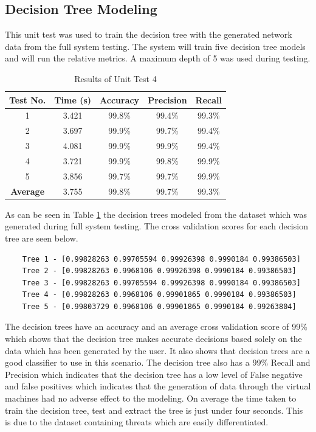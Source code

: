 \subsection{Decision Tree Modeling}
This unit test was used to train the decision tree with the generated network data from the full system testing. The system will train five decision tree models and will run the relative metrics. A maximum depth of 5 was used during testing.
\begin{table}[H]
\centering
\caption{Results of Unit Test 4}
\label{table:unittest4}
\begin{tabular}{ccccc}
    \textbf{Test No.}&\textbf{Time (s)}& \textbf{Accuracy}& \textbf{Precision}&	\textbf{Recall}\\
    \hline
    1& 3.421& 99.8\%& 99.4\%& 99.3\%\\
    2& 3.697& 99.9\%& 99.7\%& 99.4\%\\			
    3& 4.081& 99.9\%& 99.9\%& 99.4\%\\
    4& 3.721& 99.9\%& 99.8\%& 99.9\%\\
    5& 3.856& 99.7\%& 99.7\%& 99.9\%\\
    \hline
    \textbf{Average} & 3.755& 99.8\%& 99.7\%& 99.3\%\\
\end{tabular}
\end{table}
As can be seen in Table \ref{table:unittest4} the decision trees modeled from the dataset which was generated during full system testing. The cross validation scores for each decision tree are seen below.
\begin{verbatim}
    Tree 1 - [0.99828263 0.99705594 0.99926398 0.9990184 0.99386503]
    Tree 2 - [0.99828263 0.9968106 0.99926398 0.9990184 0.99386503]			
    Tree 3 - [0.99828263 0.99705594 0.99926398 0.9990184 0.99386503]
    Tree 4 - [0.99828263 0.9968106 0.99901865 0.9990184 0.99386503]
    Tree 5 - [0.99803729 0.9968106 0.99901865 0.9990184 0.99263804]
\end{verbatim}
The decision trees have an accuracy and an average cross validation score  of 99\% which shows that the decision tree makes accurate decisions based solely on the data which has been generated by the user. It also shows that decision trees are a good classifier to use in this scenario. The decision tree also has a 99\% Recall and Precision which indicates that the decision tree has a low level of False negative and false positives which indicates that the generation of data through the virtual machines had no adverse effect to the modeling. On average the time taken to train the decision tree, test and extract the tree is just under four seconds. This is due to the dataset containing threats which are easily differentiated. 

